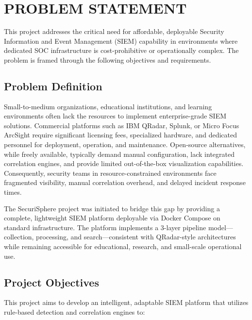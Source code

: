 \chapter{PROBLEM STATEMENT}
\label{ch:problem_statement}

This project addresses the critical need for affordable, deployable Security Information and Event Management (SIEM) capability in environments where dedicated SOC infrastructure is cost-prohibitive or operationally complex. The problem is framed through the following objectives and requirements.

\section{Problem Definition}

Small-to-medium organizations, educational institutions, and learning environments often lack the resources to implement enterprise-grade SIEM solutions. Commercial platforms such as IBM QRadar, Splunk, or Micro Focus ArcSight require significant licensing fees, specialized hardware, and dedicated personnel for deployment, operation, and maintenance. Open-source alternatives, while freely available, typically demand manual configuration, lack integrated correlation engines, and provide limited out-of-the-box visualization capabilities. Consequently, security teams in resource-constrained environments face fragmented visibility, manual correlation overhead, and delayed incident response times.

The SecuriSphere project was initiated to bridge this gap by providing a complete, lightweight SIEM platform deployable via Docker Compose on standard infrastructure. The platform implements a 3-layer pipeline model—collection, processing, and search—consistent with QRadar-style architectures while remaining accessible for educational, research, and small-scale operational use.

\section{Project Objectives}

This project aims to develop an intelligent, adaptable SIEM platform that utilizes rule-based detection and correlation engines to:


